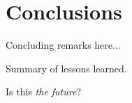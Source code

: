 \chapter{Conclusions}
%


Concluding remarks here...

Summary of lessons learned.

Is this \textit{the future}?
